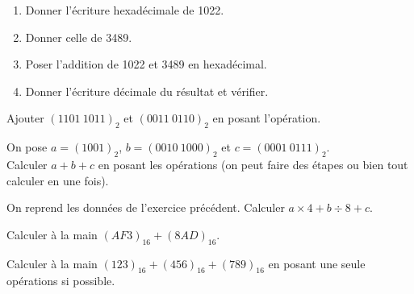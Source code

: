 \begin{exercice}
    \begin{enumerate}
        \item 	Donner l'écriture hexadécimale de 1022.
        \item 	Donner celle de 3489.
        \item 	Poser l'addition de 1022 et 3489 en hexadécimal.
        \item 	Donner l'écriture décimale du résultat et vérifier.
    \end{enumerate}
\end{exercice}

\begin{exercice}[]
    Ajouter $(1101\ 1011)_2$ et $(0011\ 0110)_2$ en posant l'opération.
\end{exercice}

\begin{exercice}[]
    On pose  $a=(1001)_2$, $b=(0010\ 1000)_2$ et $c=(0001\ 0111)_2$.\\
    
    Calculer $a +b+c$ en posant les opérations (on peut faire des étapes ou bien tout calculer en une fois).
\end{exercice}

\begin{exercice}[]
    On reprend les données de l'exercice précédent.	Calculer $a\times 4+b\div 8 +c$.
\end{exercice}

\begin{exercice}[]
    Calculer à la main $(AF3)_{16}+(8AD)_{16}$.
\end{exercice}

\begin{exercice}[]
    Calculer à la main $(123)_{16}+(456)_{16}+(789)_{16}$ en posant une seule opérations si possible.
\end{exercice}

